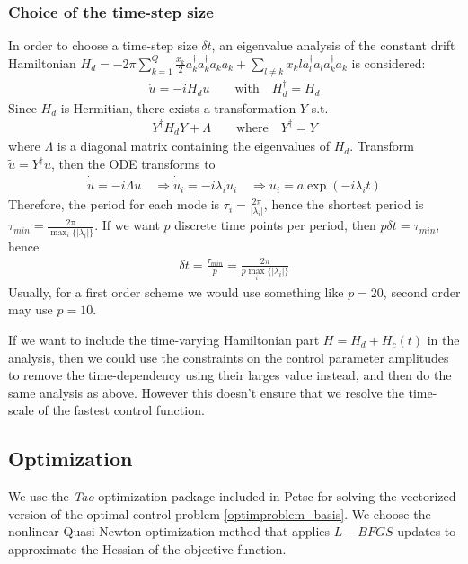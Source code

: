 \documentclass[letterpaper]{article}
\begin{document}
    \subsubsection{Choice of the time-step size}
    In order to choose a time-step size $\delta t$, an eigenvalue analysis of
    the constant drift Hamiltonian $H_d =  -2\pi \sum_{k=1}^Q \frac{x_k}{2}
    a_k^{\dagger}a_k^{\dagger}a_ka_k + \sum_{l\neq k} x_kl a_l^{\dagger}a_l
    a_k^{\dagger}a_k$ is considered:
       \begin{align*}  
         \dot u = -i H_d u \qquad \text{with} \quad H_d^{\dagger}  = H_d
       \end{align*} 
       Since $H_d$ is Hermitian, there exists a transformation $Y$ s.t. 
       \begin{align*}
         Y^{\dagger}H_d Y + \Lambda \qquad  \text{where} \quad Y^{\dagger} = Y
       \end{align*}
       where $\Lambda$ is a diagonal matrix containing the eigenvalues of $H_d$.
       Transform $\tilde u = Y^{\dagger} u$, then the ODE transforms to 
       \begin{align*}
         \dot \tilde u = -i \Lambda \tilde u \quad \Rightarrow \dot \tilde u_i =
         -i\lambda_i \tilde u_i \quad \Rightarrow \tilde u_i = a
         \exp(-i\lambda_i t)
       \end{align*}
       Therefore, the period for each mode is $\tau_i =
       \frac{2\pi}{|\lambda_i|}$, hence the shortest period is $\tau_{min} =
       \frac{2\pi}{\max_i\{|\lambda_i|\}}$. If we want $p$ discrete time points
       per period, then $p\delta t = \tau_{min}$, hence 
       \begin{align*}
         \delta t = \frac{\tau_{min}}{p} = \frac{2\pi}{p\max_i\{|\lambda_i|\}}
       \end{align*}
       Usually, for a first order scheme we would use something like $p=20$,
       second order may use $p=10$. 

       If we want to include the time-varying Hamiltonian part $H = H_d +
       H_c(t)$ in the analysis, then we could use the constraints on the control
       parameter amplitudes to remove the time-dependency using their larges
       value instead, and then do the same analysis as above. However this
       doesn't ensure that we resolve the time-scale of the fastest control
       function. 

  \subsection{Optimization}
    We use the \textit{Tao} optimization package included in Petsc for solving
    the vectorized version of the optimal control problem
    \eqref{optimproblem_basis}. We choose the nonlinear Quasi-Newton
    optimization method that applies $L-BFGS$ updates to approximate the Hessian
    of the objective function. 
\end{document}
